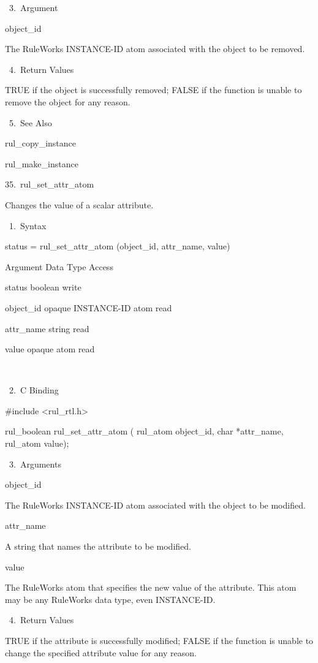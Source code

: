 {       3. Argument

          object_id

          The RuleWorks INSTANCE-ID atom
          associated with the object to be
          removed.

       4. Return Values

          TRUE if the object is successfully
          removed; FALSE if the function is
          unable to remove the object for any
          reason.

       5. See Also

    rul_copy_instance

    rul_make_instance

35. rul_set_attr_atom

    Changes the value of a scalar attribute.

       1. Syntax

          status = rul_set_attr_atom
          (object_id, attr_name, value)

          Argument  Data Type     Access

          status  boolean     write

          object_id  opaque INSTANCE-ID atom
           read

          attr_name  string     read

          value  opaque atom    read

           

       2. C Binding

          #include <rul_rtl.h>

          rul_boolean rul_set_attr_atom (
          rul_atom object_id,
          char *attr_name,
          rul_atom value);

       3. Arguments

          object_id

          The RuleWorks INSTANCE-ID atom
          associated with the object to be
          modified.

          attr_name

          A string that names the attribute to
          be modified.

          value

          The RuleWorks atom that specifies
          the new value of the attribute. This
          atom may be any RuleWorks data type,
          even INSTANCE-ID.

       4. Return Values

          TRUE if the attribute is
          successfully modified; FALSE if the
          function is unable to change the
          specified attribute value for any
          reason.

}
